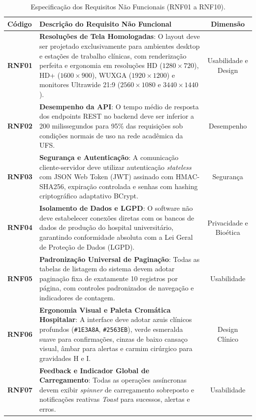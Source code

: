 \begin{table}[htb]
\centering
\small
\caption{Especificação dos Requisitos Não Funcionais (RNF01 a RNF10).}
\label{tab_rnf}
\begin{tabularx}{\textwidth}{l X c}
\toprule
\textbf{Código} & \textbf{Descrição do Requisito Não Funcional} & \textbf{Dimensão} \\
\midrule
\textbf{RNF01} & \textbf{Resoluções de Tela Homologadas}: O layout deve ser projetado exclusivamente para ambientes desktop e estações de trabalho clínicas, com renderização perfeita e ergonomia em resoluções HD ($1280 \times 720$), HD+ ($1600 \times 900$), WUXGA ($1920 \times 1200$) e monitores Ultrawide 21:9 ($2560 \times 1080$ e $3440 \times 1440$). & Usabilidade e Design \\
\midrule
\textbf{RNF02} & \textbf{Desempenho da API}: O tempo médio de resposta dos endpoints REST no backend deve ser inferior a 200 milissegundos para 95\% das requisições sob condições normais de uso na rede acadêmica da UFS. & Desempenho \\
\midrule
\textbf{RNF03} & \textbf{Segurança e Autenticação}: A comunicação cliente-servidor deve utilizar autenticação \textit{stateless} com JSON Web Token (JWT) assinado com HMAC-SHA256, expiração controlada e senhas com hashing criptográfico adaptativo BCrypt. & Segurança \\
\midrule
\textbf{RNF04} & \textbf{Isolamento de Dados e LGPD}: O software não deve estabelecer conexões diretas com os bancos de dados de produção do hospital universitário, garantindo conformidade absoluta com a Lei Geral de Proteção de Dados (LGPD). & Privacidade e Bioética \\
\midrule
\textbf{RNF05} & \textbf{Padronização Universal de Paginação}: Todas as tabelas de listagem do sistema devem adotar paginação fixa de exatamente 10 registros por página, com controles padronizados de navegação e indicadores de contagem. & Usabilidade \\
\midrule
\textbf{RNF06} & \textbf{Ergonomia Visual e Paleta Cromática Hospitalar}: A interface deve adotar azuis clínicos profundos (\texttt{\#1E3A8A}, \texttt{\#2563EB}), verde esmeralda suave para confirmações, cinzas de baixo cansaço visual, âmbar para alertas e carmim cirúrgico para gravidades H e I. & Design Clínico \\
\midrule
\textbf{RNF07} & \textbf{Feedback e Indicador Global de Carregamento}: Todas as operações assíncronas devem exibir \textit{spinner} de carregamento sobreposto e notificações reativas \textit{Toast} para sucessos, alertas e erros. & Usabilidade \\

\end{tabularx}
\end{table}
